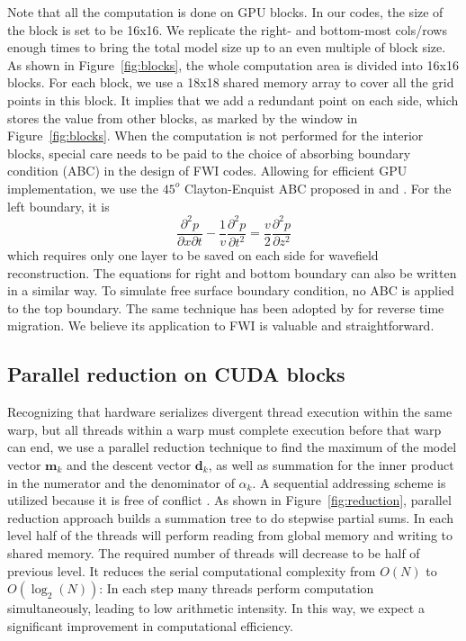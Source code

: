 Note that all the computation is done on GPU blocks. In our codes, the size of the block is set to be 16x16. We replicate the right- and bottom-most cols/rows enough times to bring the total model size up to an even multiple of block size. As shown in Figure~\ref{fig:blocks}, the whole computation area is divided into 16x16 blocks. For each block, we use a 18x18 shared memory array to cover all the grid points in this block. It implies that we add a redundant point on each side, which stores the value from other blocks, as marked by the window in Figure~\ref{fig:blocks}.  When the computation is not performed for the interior blocks, special care needs to be paid to the choice of absorbing boundary condition (ABC) in the design of FWI codes. Allowing for efficient GPU implementation, we use the $45^o$ Clayton-Enquist ABC proposed in \cite{clayton1977absorbing} and \cite{engquist1977absorbing}. For the left boundary, it is
\begin{equation}
 \frac{\partial^2 p}{\partial x\partial t}-\frac{1}{v}\frac{\partial^2 p}{\partial t^2}=\frac{v}{2}\frac{\partial^2 p}{\partial z^2}
\end{equation}
which requires only one layer to be saved on each side for wavefield reconstruction. The equations for right and bottom boundary can also be written in a similar way. To simulate free surface boundary condition, no ABC is applied to the top boundary. The same technique has been adopted by \cite{liu2013wavefield} for reverse time migration. We believe its application to FWI is valuable and straightforward.



\subsection{Parallel reduction on CUDA blocks}

Recognizing that hardware serializes divergent thread execution within the same warp, but all threads within a warp must complete execution before that warp can end, we use a parallel reduction technique to find the maximum of the model vector $\textbf{m}_k$ and the descent vector $\textbf{d}_k$, as well as summation for the inner product in the numerator and the denominator of $\alpha_k$. 
A sequential addressing scheme is utilized because it is free of conflict \citep{harris2007optimizing}. As shown in Figure~\ref{fig:reduction}, parallel reduction approach builds a summation tree to do stepwise partial sums.  In each level half of the threads will perform reading from global memory and writing to shared memory. The required number of threads will decrease to be half of previous level. It reduces the serial computational complexity from $O(N)$ to $O(\log_2(N))$: In each step many threads perform computation simultaneously, leading to low arithmetic intensity. In this way, we expect a significant improvement in computational efficiency. 

